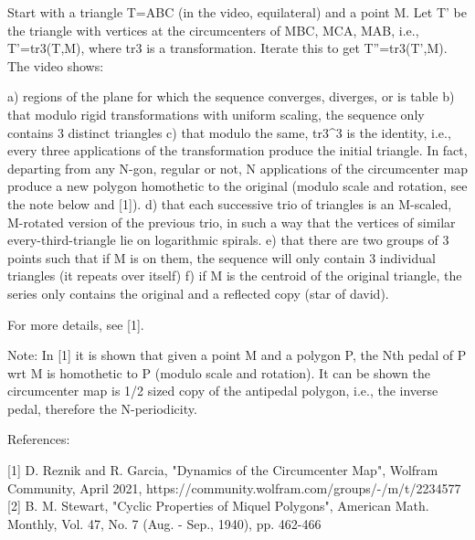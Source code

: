 Start with a triangle T=ABC (in the video, equilateral) and a point M. Let T' be the triangle with vertices at the circumcenters of MBC, MCA, MAB, i.e., T'=tr3(T,M), where tr3 is a transformation. Iterate this to get T''=tr3(T',M). The video shows:

a) regions of the plane for which the sequence converges, diverges, or is table
b) that modulo rigid transformations with uniform scaling, the sequence only contains 3 distinct triangles
c) that modulo the same, tr3^3 is the identity, i.e., every three applications of the transformation produce the initial triangle. In fact, departing from any N-gon, regular or not, N applications of the circumcenter map produce a new polygon homothetic to the original (modulo scale and rotation, see the note below and [1]). 
d) that each successive trio of triangles is an M-scaled, M-rotated version of the previous trio, in such a way that the vertices of similar every-third-triangle lie on logarithmic spirals.
e) that there are two groups of 3 points such that if M is on them, the sequence will only contain 3 individual triangles (it repeats over itself)
f) if M is the centroid of the original triangle, the series only contains the original and a reflected copy (star of david).

For more details, see [1]. 

Note: In [1] it is shown that given a point M and a polygon P,  the Nth pedal of P wrt M is homothetic to P (modulo scale and rotation). It can be shown the circumcenter map is 1/2 sized copy of the antipedal polygon, i.e., the inverse pedal, therefore the N-periodicity. 

References:

[1] D. Reznik and R. Garcia, "Dynamics of the Circumcenter Map", Wolfram Community, April 2021, https://community.wolfram.com/groups/-/m/t/2234577
[2]  B. M. Stewart, "Cyclic Properties of Miquel Polygons",  American Math. Monthly, Vol. 47, No. 7 (Aug. - Sep., 1940), pp. 462-466